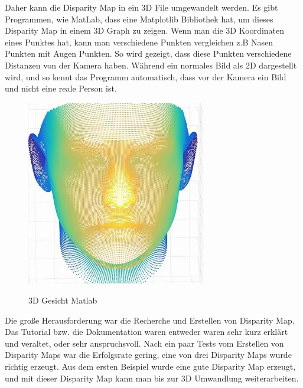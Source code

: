 \bigbreak
Daher kann die Disparity Map in ein 3D File umgewandelt werden. Es gibt Programmen, wie MatLab, dass eine Matplotlib Bibliothek hat, um dieses Disparity Map in einem 3D Graph zu zeigen. Wenn man die 3D Koordinaten eines Punktes hat, kann man verschiedene Punkten vergleichen z.B Nasen Punkten mit Augen Punkten. So wird gezeigt, dass diese Punkten verschiedene Distanzen von der Kamera haben. Während ein normales Bild als 2D dargestellt wird, und so kennt das Programm automatisch, dass vor der Kamera ein Bild und nicht eine reale Person ist.
\begin{figure}[ht]
  \centering
    \includegraphics[width=0.7\textwidth]{./figures/matlib.jpg}
      \caption{3D Gesicht Matlab}
      \cite{matlab}
\end{figure}
\bigbreak
Die große Herausforderung war die Recherche und Erstellen von Disparity Map. Das Tutorial bzw. die Dokumentation waren entweder waren sehr kurz erklärt und veraltet, oder sehr anspruchsvoll. Nach ein paar Tests vom Erstellen von Disparity Maps war die Erfolgsrate gering, eine von drei Disparity Maps wurde  richtig erzeugt.
\bigbreak
\newpage
Aus dem ersten Beispiel wurde eine gute Disparity Map erzeugt, und mit dieser Disparity Map kann man bis zur 3D Umwandlung  weiterarbeiten.
